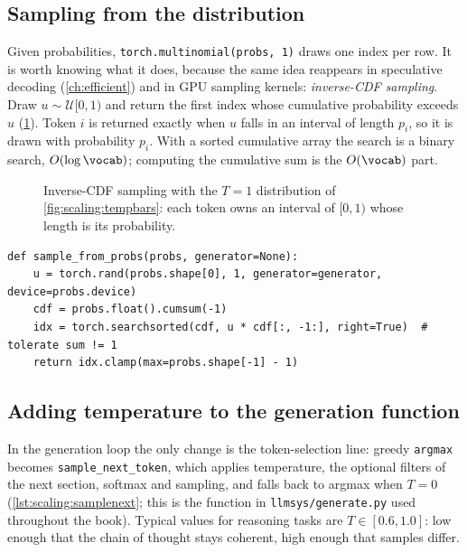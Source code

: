 \subsection{Sampling from the distribution}\label{sec:scaling:sample}
Given probabilities, \texttt{torch.multinomial(probs, 1)} draws one index per row. It is worth
knowing what it does, because the same idea reappears in speculative decoding (\cref{ch:efficient})
and in GPU sampling kernels: \emph{inverse-CDF sampling}. Draw $u \sim \mathcal{U}[0,1)$ and return
the first index whose cumulative probability exceeds $u$ (\cref{fig:scaling:icdf}). Token $i$ is
returned exactly when $u$ falls in an interval of length $p_i$, so it is drawn with probability
$p_i$. With a sorted cumulative array the search is a binary search, $O(\log \vocab)$; computing the
cumulative sum is the $O(\vocab)$ part.

\begin{figure}[t]
\centering
{}
\caption{Inverse-CDF sampling with the $T=1$ distribution of \cref{fig:scaling:tempbars}: each
token owns an interval of $[0,1)$ whose length is its probability.}
\label{fig:scaling:icdf}
\end{figure}

\begin{lstlisting}[caption={Inverse-CDF sampling, one token per row (Lab 15, Task 3).},label={lst:scaling:icdf}]
def sample_from_probs(probs, generator=None):
    u = torch.rand(probs.shape[0], 1, generator=generator, device=probs.device)
    cdf = probs.float().cumsum(-1)
    idx = torch.searchsorted(cdf, u * cdf[:, -1:], right=True)  # tolerate sum != 1
    return idx.clamp(max=probs.shape[-1] - 1)
\end{lstlisting}

\subsection{Adding temperature to the generation function}\label{sec:scaling:addtemp}
In the generation loop the only change is the token-selection line: greedy \texttt{argmax}
becomes \texttt{sample\_next\_token}, which applies temperature, the optional filters of the next
section, softmax and sampling, and falls back to argmax when $T = 0$
(\cref{lst:scaling:samplenext}; this is the function in \texttt{llmsys/generate.py} used throughout
the book). Typical values for reasoning tasks are $T \in [0.6, 1.0]$: low enough that the chain of
thought stays coherent, high enough that samples differ.

